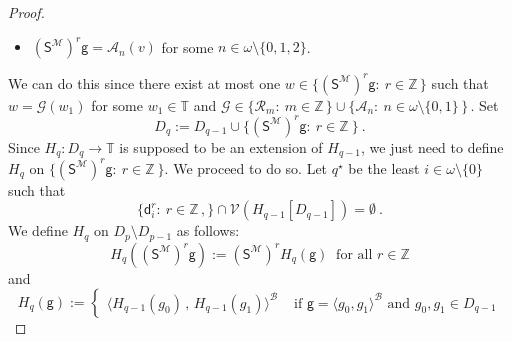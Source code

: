 \documentclass[10pt,a4paper, openany,  oldfontcommands]{memoir}
\newtheorem{open problem} [theorem] {Open Problem}
\newtheorem{open question} [theorem] {Open Question}
\renewcommand{\mathrm}{\mathsf}
\begin{document}
\begin{proof}
\begin{itemize}
\item[-]   $   \left(  \mathrm{S}^{  \mathcal{M}  }  \right)^r   \mathsf{g}   =   \mathcal{A}_n \left(  v  \right)  $ 
for some  $  n \in  \omega  \setminus  \lbrace 0, 1,  2  \rbrace $.
\end{itemize} 
We can do this since   there  exist   at most one
     $  w   \in  \lbrace   \left(   \mathrm{S}^{  \mathcal{M}  }  \right)^r    \mathsf{g} :   \   r  \in  \mathbb{Z}   \,   \rbrace   $  
   such that   $  w  =  \mathcal{G} \left( w_1   \right)  $  for some  
   $  w_1  \in  \mathbb{T}  $  and  
   $    \mathcal{G}  \in    \lbrace  \mathcal{R}_m  :   \   m  \in  \mathbb{Z}  \,   \rbrace    \cup  
  \lbrace  \mathcal{A}_n   :   \   n  \in  \omega  \setminus  \lbrace 0,   1   \rbrace   \,   \rbrace        \,     $.
 Set  
\[
D_q  :=  D_{ q-1 }  \cup  
  \big\{  \left(   \mathrm{S}^{  \mathcal{M}  }  \right)^r   \mathsf{g}   :   \  r  \in  \mathbb{Z}  \   \big\}
\       .
\]
Since  $  H_q  :   D_q  \to   \mathbb{T} $  is  supposed to be   an extension of  $  H_{ q-1 }  $, 
  we just    need to define    $  H_q $   on   
  $  \big\{  \left(   \mathrm{S}^{  \mathcal{M}  }  \right)^r   \mathsf{g}   :   \  r  \in  \mathbb{Z}  \   \big\}  $. 
  We proceed to do so. 
Let  $ q^{  \star }   $  be  the least  $  i  \in  \omega \setminus  \lbrace 0  \rbrace  $  such that   
 \[
 \big\{  \mathsf{d}^r_{  i   }  :   \   r   \in     \mathbb{Z}   \,  ,  \big\}  
   \cap     
    \mathcal{V}     \left(   H_{ q-1}  \left[  D_{q-1}   \right]   \right) 
  = 
   \emptyset  
  \     .
  \]  
We define   $  H_q  $ on  $  D_p  \setminus  D_{p-1}  $  as follows: 
\[
H_q  \left(      \left(   \mathrm{S}^{  \mathcal{M}  }  \right)^r   \mathsf{g}     \right)   
 := 
   \left(   \mathrm{S}^{  \mathcal{M}  }  \right)^r   H_q  \left(      \mathsf{g}     \right)   
   \     \mbox{  for  all }   r  \in  \mathbb{Z}   
\]
and    
\[
  H_q  \left(      \mathsf{g}     \right)   
:=  
\begin{cases}
  \langle H_{ q-1} ( g_0 )   \,  ,  \,   H_{ q-1} ( g_1 )   \rangle^{  \mathcal{B}  }
         &   \mbox{ if  }   \mathsf{g}   = \langle  g_0   ,      g_1   \rangle^{  \mathcal{B}  }  
                      \mbox{  and  }    g_0,  g_1   \in   D_{ q-1 }


\end{cases}\]
\end{proof}
\end{document}
